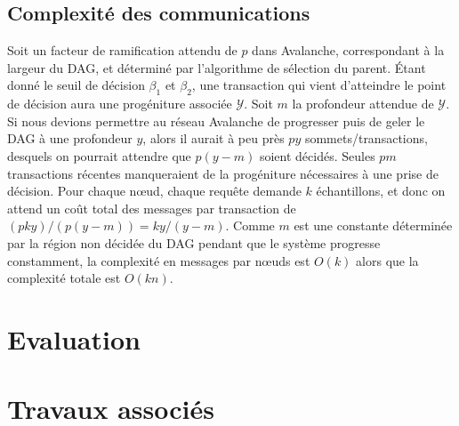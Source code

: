 \documentclass[a4,twocolumn,10pt]{article}
\theoremstyle{definition}
\begin{document}
\subsection{Complexité des communications}
Soit un facteur de ramification attendu de $p$ dans Avalanche, correspondant à la largeur du DAG, et déterminé par l'algorithme de sélection du parent.
Étant donné le seuil de décision $\beta_1$ et $\beta_2$, une transaction qui vient d'atteindre le point de décision aura une progéniture associée $\mathcal{Y}$.
Soit $m$ la profondeur attendue de $\mathcal{Y}$.
Si nous devions permettre au réseau Avalanche de progresser puis de geler le DAG à une profondeur $y$, alors il aurait à peu près $py$ sommets/transactions, desquels on pourrait attendre que $p(y - m)$ soient décidés.
Seules $pm$ transactions récentes manqueraient de la progéniture nécessaires à une prise de décision.
Pour chaque nœud, chaque requête demande $k$ échantillons, et donc on attend un coût total des messages par transaction de $(pky) / (p(y - m)) = ky/(y-m)$.
Comme $m$ est une constante déterminée par la région non décidée du DAG pendant que le système progresse constamment, la complexité en messages par nœuds est $O(k)$ alors que la complexité totale est $O(kn)$.

\section{Evaluation}
\label{sec:evaluation}


\section{Travaux associés}
\label{sec:related-work}

\end{document}
